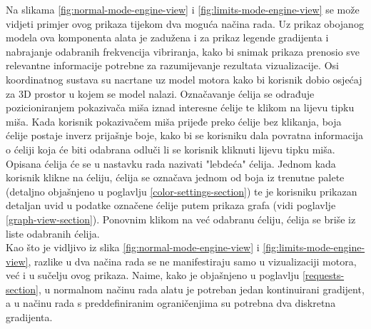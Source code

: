 \documentclass[times, utf8, diplomski]{fer}
\begin{document}
Na slikama \ref{fig:normal-mode-engine-view} i \ref{fig:limits-mode-engine-view} se može vidjeti primjer ovog prikaza tijekom dva moguća načina rada. Uz prikaz obojanog modela ova komponenta alata je zadužena i za prikaz legende gradijenta i nabrajanje odabranih frekvencija vibriranja, kako bi snimak prikaza prenosio sve relevantne informacije potrebne za razumijevanje rezultata vizualizacije. Osi koordinatnog sustava su nacrtane uz model motora kako bi korisnik dobio osjećaj za 3D prostor u kojem se model nalazi. Označavanje ćelija se odrađuje pozicioniranjem pokazivača miša iznad interesne ćelije te klikom na lijevu tipku miša. Kada korisnik pokazivačem miša prijeđe preko ćelije bez klikanja, boja ćelije postaje inverz prijašnje boje, kako bi se korisniku dala povratna informacija o ćeliji koja će biti odabrana odluči li se korisnik kliknuti lijevu tipku miša. Opisana ćelija će se u nastavku rada nazivati "lebdeća" ćelija. Jednom kada korisnik klikne na ćeliju, ćelija se označava jednom od boja iz trenutne palete (detaljno objašnjeno u poglavlju \ref{color-settings-section}) te je korisniku prikazan detaljan uvid u podatke označene ćelije putem prikaza grafa (vidi poglavlje \ref{graph-view-section}). Ponovnim klikom na već odabranu ćeliju, ćelija se briše iz liste odabranih ćelija.\\

Kao što je vidljivo iz slika \ref{fig:normal-mode-engine-view} i \ref{fig:limits-mode-engine-view}, razlike u dva načina rada se ne manifestiraju samo u vizualizaciji motora, već i u sučelju ovog prikaza. Naime, kako je objašnjeno u poglavlju \ref{requests-section}, u normalnom načinu rada alatu je potreban jedan kontinuirani gradijent, a u načinu rada s preddefiniranim ograničenjima su potrebna dva diskretna gradijenta.
\end{document}
